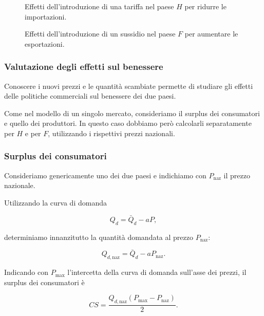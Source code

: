 \begin{figure}[ht]
\centering
\resizebox{\linewidth}{!}{%

}
\caption{Effetti dell'introduzione di una tariffa nel paese $H$ per ridurre le importazioni.}
\label{fig:mercati_HWF_tariffa}
\end{figure}

\begin{figure}[ht]
\centering
\resizebox{\linewidth}{!}{%

}
\caption{Effetti dell'introduzione di un sussidio nel paese $F$ per aumentare le esportazioni.}
\label{fig:mercati_HWF_sussidio}
\end{figure}

\subsubsection{Valutazione degli effetti sul benessere}

Conoscere i nuovi prezzi e le quantità scambiate permette di
studiare gli effetti delle politiche commerciali sul benessere
dei due paesi.

Come nel modello di un singolo mercato, consideriamo il surplus
dei consumatori e quello dei produttori. In questo caso dobbiamo
però calcolarli separatamente per $H$ e per $F$, utilizzando i
rispettivi prezzi nazionali.


\subsubsection{Surplus dei consumatori}

Consideriamo genericamente uno dei due paesi e indichiamo con
$P_{\mathrm{naz}}$ il prezzo nazionale.

Utilizzando la curva di domanda

\begin{equation*}
    Q_d=\bar Q_d-aP,
\end{equation*}

determiniamo innanzitutto la quantità domandata al prezzo
$P_{\mathrm{naz}}$:

\begin{equation*}
    Q_{d,\mathrm{naz}}
    =
    \bar Q_d-aP_{\mathrm{naz}}.
\end{equation*}

Indicando con $P_{\max}$ l'intercetta della curva di domanda
sull'asse dei prezzi, il surplus dei consumatori è

\begin{equation*}
    CS
    =
    \frac{
        Q_{d,\mathrm{naz}}
        \left(P_{\max}-P_{\mathrm{naz}}\right)
    }{2}.
    \label{eq:consumer-surplus-internazionale}
\end{equation*}


